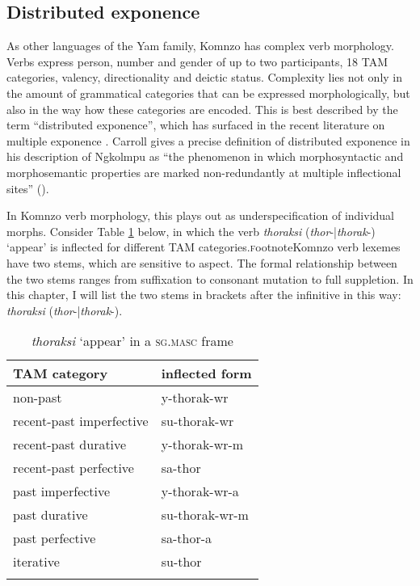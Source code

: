 \documentclass[output=paper]{langscibook}
\begin{document}
\subsection{Distributed exponence}\label{distexp}
As other languages of the Yam family, Komnzo has complex verb morphology. Verbs express person, number and gender of up to two participants, 18 TAM categories, valency, directionality and deictic status. Complexity lies not only in the amount of grammatical categories that can be expressed morphologically, but also in the way how these categories are encoded. This is best described by the term ``distributed exponence'', which has surfaced in the recent literature on multiple exponence \citep{CaballeroHarris2012}. Carroll gives a precise definition of distributed exponence in his description of Ngkolmpu as ``the phenomenon in which morphosyntactic and morphosemantic properties are marked non-redundantly at multiple inflectional sites'' (\citeyear[268]{Carroll2016}).

In Komnzo verb morphology, this plays out as underspecification of individual morphs. Consider Table \ref{table2} below, in which the verb \emph{thoraksi} (\emph{thor}-|\emph{thorak}-) `appear' is inflected for different TAM categories.\textsc{f}ootnote{Komnzo verb lexemes have two stems, which are sensitive to aspect. The formal relationship between the two stems ranges from suffixation to consonant mutation to full suppletion. In this chapter, I will list the two stems in brackets after the infinitive in this way: \emph{thoraksi} (\emph{thor}-|\emph{thorak}-).}

\begin{table}
	\caption{\emph{thoraksi} `appear' in a \textsc{sg.masc} frame}
	\begin{tabular}{ll}
		\lsptoprule
		TAM category&inflected form\\
		\hline
		non-past&{y-thorak-wr}\\
		recent-past imperfective&{su-thorak-wr}\\
		recent-past durative&{y-thorak-wr-m}\\
		recent-past perfective&{sa-thor}\\
		past imperfective&{y-thorak-wr-a}\\
		past durative&{su-thorak-wr-m}\\
		past perfective&{sa-thor-a}\\
		iterative&{su-thor}\\
		\lspbottomrule
	\end{tabular}
	\label{table2}
\end{table}
\end{document}
